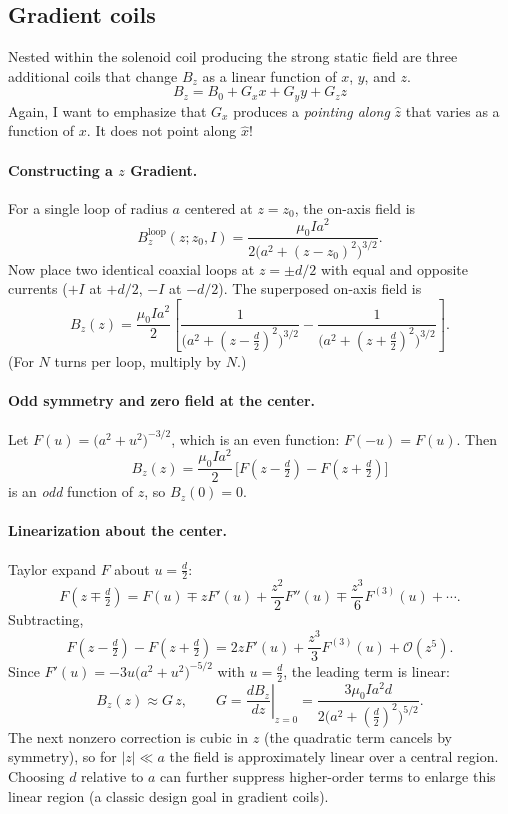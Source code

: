 \documentclass[12pt]{article}
\begin{document}
{\subsection{Gradient coils}

Nested within the solenoid coil producing the strong static field are three additional coils that change $B_z$ as a linear function of $x$, $y$, and $z$. 
\begin{equation}
    B_z = B_0 + G_x x + G_y y + G_z z
\end{equation}
Again, I want to emphasize that $G_x$ produces a \emph{pointing along} $\hat{z}$ that varies as a function of $x$. It does not point along $\hat{x}$! 



\paragraph{Constructing a $z$ Gradient.}
For a single loop of radius $a$ centered at $z=z_0$, the on-axis field is
\[
B_z^{\text{loop}}(z;z_0,I)=\frac{\mu_0 I a^2}{2\big(a^2+(z-z_0)^2\big)^{3/2}}.
\]
Now place two identical coaxial loops at $z=\pm d/2$ with equal and opposite currents ($+I$ at $+d/2$, $-I$ at $-d/2$). The superposed on-axis field is
\[
\boxed{\,B_z(z)=\frac{\mu_0 I a^2}{2}\!\left[
\frac{1}{\big(a^2+(z-\tfrac{d}{2})^2\big)^{3/2}}
-\frac{1}{\big(a^2+(z+\tfrac{d}{2})^2\big)^{3/2}}
\right].\,}
\]
(For $N$ turns per loop, multiply by $N$.)

\paragraph{Odd symmetry and zero field at the center.}
Let $F(u)=\big(a^2+u^2\big)^{-3/2}$, which is an even function: $F(-u)=F(u)$. Then
\[
B_z(z)=\frac{\mu_0 I a^2}{2}\,\big[F(z-\tfrac{d}{2})-F(z+\tfrac{d}{2})\big]
\]
is an \emph{odd} function of $z$, so $B_z(0)=0$.

\paragraph{Linearization about the center.}
Taylor expand $F$ about $u=\tfrac{d}{2}$:
\[
F(z\!\mp\!\tfrac{d}{2})=F(u)\mp z F'(u)+\frac{z^2}{2}F''(u)\mp\frac{z^3}{6}F^{(3)}(u)+\cdots.
\]
Subtracting,
\[
F(z-\tfrac{d}{2})-F(z+\tfrac{d}{2})=2zF'(u)+\frac{z^3}{3}F^{(3)}(u)+\mathcal{O}(z^5).
\]
Since $F'(u)=-3u\big(a^2+u^2\big)^{-5/2}$ with $u=\tfrac{d}{2}$, the leading term is linear:
\[
\boxed{\,B_z(z)\approx G\,z,\qquad
G=\left.\frac{dB_z}{dz}\right|_{z=0}
=\frac{3\mu_0 I a^2 d}{2\big(a^2+(\tfrac{d}{2})^2\big)^{5/2}}.\,}
\]
The next nonzero correction is cubic in $z$ (the quadratic term cancels by symmetry), so for $|z|\ll a$ the field is approximately linear over a central region. Choosing $d$ relative to $a$ can further suppress higher-order terms to enlarge this linear region (a classic design goal in gradient coils).


}
\end{document}
